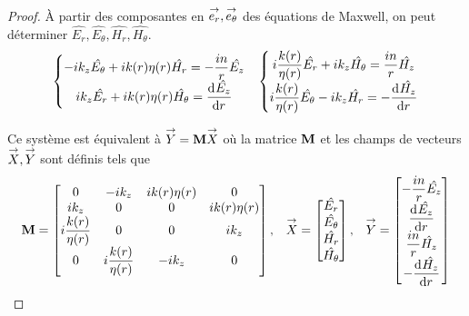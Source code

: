     \begin{proof}
      À partir des composantes en \(\vect{e_r},\vect{e_\theta}\) des équations de Maxwell, on peut déterminer \(\hat{E_r},\hat{E_\theta},\hat{H_r},\hat{H_\theta}\).
      \begin{align*}
        \left\lbrace
        \begin{matrix}
          -ik_z\hat{E_\theta} + ik(r)\eta(r) \hat{H_r} = -\frac{in}{r}\hat{E_z}
          \\
          ik_z\hat{E_r} + ik(r)\eta(r) \hat{H_\theta} = \ddp{r}{\hat{E_z}}
        \end{matrix}
        \right.
        &&
        \left\lbrace
        \begin{matrix}
          i\frac{k(r)}{\eta(r)} \hat{E_r} + ik_z \hat{H_\theta} = \frac{in}{r}\hat{H_z}
          \\
          i\frac{k(r)}{\eta(r)} \hat{E_\theta} - ik_z \hat{H_r} = -\ddp{r}{\hat{H_z}}
        \end{matrix}
        \right.
      \end{align*}

      Ce système est équivalent à \(\vect{Y} = \mat{M}\vect{X}\) où la matrice \(\mat{M}\) et les champs de vecteurs \(\vect{X}, \vect{Y}\) sont définis tels que
      \begin{align*}
        \mat{M} =
        \begin{bmatrix}
        0 & -ik_z & ik(r)\eta(r) & 0
        \\
        ik_z & 0 & 0 & ik(r)\eta(r)
        \\
        i\frac{k(r)}{\eta(r)} & 0 & 0 & ik_z
        \\
        0 & i\frac{k(r)}{\eta(r)} & -ik_z & 0
        \end{bmatrix}
        ,&&
        \vect{X} =
        \begin{bmatrix}
          \hat{E_r}\\
          \hat{E_\theta}\\
          \hat{H_r}\\
          \hat{H_\theta}
        \end{bmatrix}
        ,&&
        \vect{Y} =
        \begin{bmatrix}
          -\frac{in}{r}\hat{E_z}\\
          \ddp{r}{\hat{E_z}}\\
          \frac{in}{r}\hat{H_z}\\
          -\ddp{r}{\hat{H_z}}
        \end{bmatrix}
      \end{align*}


\end{proof}
